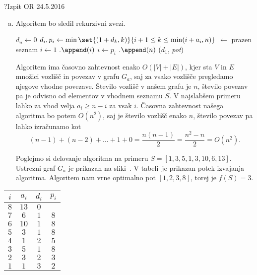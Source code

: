 \begin{naloga}{?}{Izpit OR 24.5.2016}
\begin{odgovor}
\begin{enumerate}[(a)]
\item Algoritem bo sledil rekurzivni zvezi.

\begin{small}
\begin{algorithmic}
	\State $d_n \gets 0$
		\State $d_i, p_i \gets
            \min\set{(1+d_k, k)}{i+1 \le k \le \min(i+a_i, n)}$
	\EndFor
	 $\gets$ prazen seznam
	\State $i \gets 1$
		.$\append(i)$
		\State $i \gets p_i$
	\EndWhile
    .$\append(n)$
	\State \Return ($d_1$, {\sl pot})
\EndFunction
\end{algorithmic}
\end{small}

Algoritem ima časovno zahtevnost enako $O(|V| + |E|)$,
kjer sta $V$ in $E$ množici vozlišč in povezav v grafu $G_a$,
saj za vsako vozlišče pregledamo njegove vhod\-ne povezave.
Število vozlišč v našem grafu je $n$, število povezav pa je odvisno od elementov v vhodnem seznamu $S$.
V najslabšem primeru lahko za vhod velja $a_i \ge n-i$ za vsak $i$.
Časovna zahtevnost našega algoritma bo potem $O(n^2)$,
saj je število vozlišč enako $n$,
število povezav pa lahko izračunamo kot
$$
(n - 1) + (n - 2) + \dots + 1 + 0 = \frac{n (n - 1)}{2}
= \frac{n ^2 - n}{2} = O(n^2) .
$$

Poglejmo si delovanje algoritma na primeru $S = [1,3,5,1,3,10,6,13]$.
Ustrezni graf $G_a$ je prikazan na sliki~\fig.
V tabeli~\tab je prikazan potek izvajanja algoritma.
Algoritem nam vrne optimalno pot $[1, 2, 3, 8]$, torej je $f(S) = 3$.
\end{enumerate}

\begin{slika}
\pgfslika
{}
\end{slika}

\begin{tabela}
\begin{tabular}{cc|cc}
$i$ & $a_i$ & $d_i$ & $p_i$ \\ \hline
$8$ & $13$ & $0$       \\
$7$ & $6$  & $1$ & $8$ \\
$6$ & $10$ & $1$ & $8$ \\
$5$ & $3$  & $1$ & $8$ \\
$4$ & $1$  & $2$ & $5$ \\
$3$ & $5$  & $1$ & $8$ \\
$2$ & $3$  & $2$ & $3$ \\
$1$ & $1$  & $3$ & $2$
\end{tabular}
\end{tabela}

\end{odgovor}
\end{naloga}
